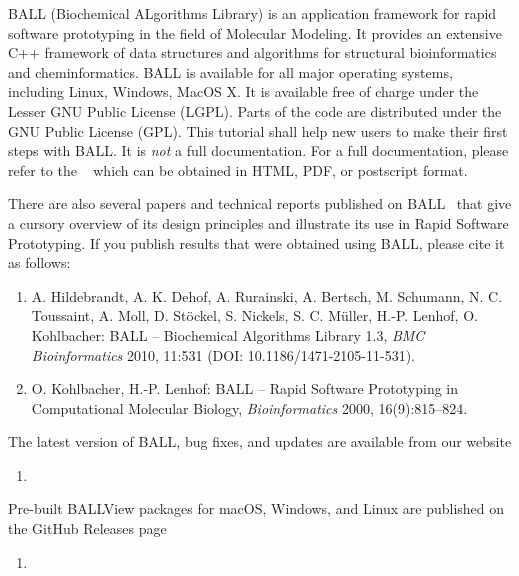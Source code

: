 \noindent
BALL (Biochemical ALgorithms Library) is an application framework for rapid
software prototyping in the field of Molecular Modeling.
It provides an extensive C++ framework of data structures and algorithms for
structural bioinformatics and cheminformatics.
BALL is available for all major operating systems, including Linux, Windows, MacOS X.
It is available free of charge under the Lesser GNU Public License (LGPL).
Parts of the code are distributed under the GNU Public License (GPL).
This tutorial shall help new users to make their first steps with BALL.
It is {\em not} a full documentation. For a full documentation, please refer to the ~\cite{BALL-RM} which can be obtained in HTML, PDF, or postscript format.

There are also several papers and technical reports published on
BALL~\cite{Hildebrandt2010BALL,BKL99a,BKL99b,KL99,Koh2001,KL2000,MHLK05,MHLK06}
that give a cursory overview of its design principles and illustrate its use in
Rapid Software Prototyping. If you publish results that were obtained using
BALL, please cite it as follows:
\begin{enumerate}
  \item[] A. Hildebrandt, A. K. Dehof, A. Rurainski, A. Bertsch,
          M. Schumann, N. C. Toussaint, A. Moll, D. St\"{o}ckel,
          S. Nickels, S. C. M\"{u}ller, H.-P. Lenhof, O. Kohlbacher:
          BALL -- Biochemical Algorithms Library 1.3,
          {\em BMC Bioinformatics} 2010, 11:531
          (DOI: 10.1186/1471-2105-11-531).
  \item[] O. Kohlbacher, H.-P. Lenhof: BALL -- Rapid Software Prototyping
          in Computational Molecular Biology, {\em Bioinformatics} 2000,
          16(9):815--824.
\end{enumerate}

\noindent
The latest version of BALL, bug fixes, and updates are available from our
website

\begin{enumerate}
  \item[] 
\end{enumerate}

\noindent
Pre-built BALLView packages for macOS, Windows, and Linux are published on the
GitHub Releases page

\begin{enumerate}
  \item[] 
\end{enumerate}

